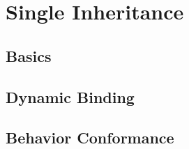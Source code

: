 \section{Single Inheritance}

\subsection{Basics}

\subsection{Dynamic Binding}

\subsection{Behavior Conformance}

